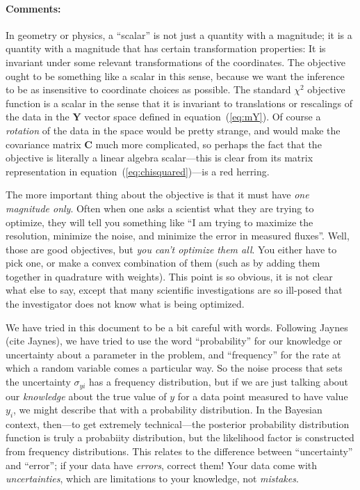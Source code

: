 \documentclass[12pt]{article}
\newcommand{\equationname}{equation}
\newcommand{\commentsname}{Comments}
\newcounter{problem}
\newenvironment{comments}{\paragraph{\commentsname:}}{}
\newcommand{\mmatrix}[1]{\boldsymbol{#1}}
\newcommand{\mC}{\mmatrix{C}}
\newcommand{\mY}{\mmatrix{Y}}
\begin{document}
\begin{comments}
In geometry or physics, a ``scalar'' is not just a quantity with a
magnitude; it is a quantity with a magnitude that has certain
transformation properties: It is invariant under some relevant
transformations of the coordinates.  The objective ought to be
something like a scalar in this sense, because we want the inference
to be as insensitive to coordinate choices as possible.  The standard
$\chi^2$ objective function is a scalar in the sense that it is
invariant to translations or rescalings of the data in the $\mY$
vector space defined in \equationname~(\ref{eq:mY}).  Of course a
\emph{rotation} of the data in the space would be pretty strange, and
would make the covariance matrix $\mC$ much more complicated, so
perhaps the fact that the objective is literally a linear algebra
scalar---this is clear from its matrix representation in
\equationname~(\ref{eq:chisquared})---is a red herring.

The more important thing about the objective is that it must have
\emph{one magnitude only}.  Often when one asks a scientist what they
are trying to optimize, they will tell you something like ``I am
trying to maximize the resolution, minimize the noise, and minimize
the error in measured fluxes''.  Well, those are good objectives, but
\emph{you can't optimize them all}.  You either have to pick one, or
make a convex combination of them (such as by adding them together in
quadrature with weights).  This point is so obvious, it is not clear
what else to say, except that many scientific investigations are so
ill-posed that the investigator does not know what is being optimized.

We have tried in this document to be a bit careful with words.
Following Jaynes (cite Jaynes), we have tried to use the word
``probability'' for our knowledge or uncertainty about a parameter in
the problem, and ``frequency'' for the rate at which a random variable
comes a particular way.  So the noise process that sets the
uncertainty $\sigma_{yi}$ has a frequency distribution, but if we are
just talking about our \emph{knowledge} about the true value of $y$
for a data point measured to have value $y_i$, we might describe that
with a probability distribution.  In the Bayesian context, then---to
get extremely technical---the posterior probability distribution
function is truly a probabiity distribution, but the likelihood factor
is constructed from frequency distributions.  This relates to the
difference between ``uncertainty'' and ``error''; if your data have
\emph{errors}, correct them!  Your data come with
\emph{uncertainties}, which are limitations to your knowledge, not
\emph{mistakes}.


\end{comments}
\end{document}
